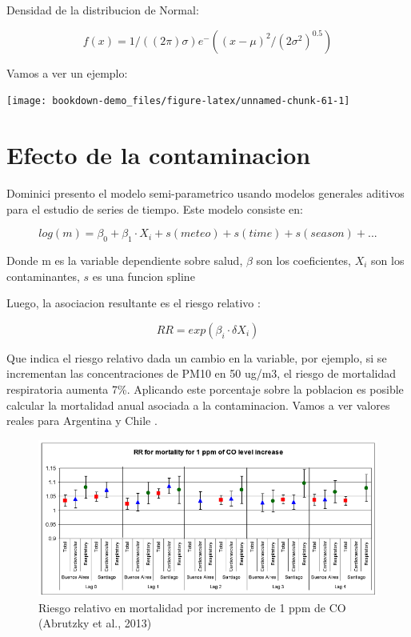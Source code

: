 \documentclass[]{book}
\begin{document}
Densidad de la distribucion de Normal:

\begin{equation}
f(x) = 1/( (2 \pi) \sigma) e^-((x - \mu)^2/(2 \sigma^2)^0.5 )
\label{eq:13}
\end{equation}

Vamos a ver un ejemplo:

\texttt{[image: bookdown-demo\_files/figure-latex/unnamed-chunk-61-1]}

\hypertarget{efecto-de-la-contaminacion}{%
\section{Efecto de la contaminacion}\label{efecto-de-la-contaminacion}}

Dominici presento el modelo semi-parametrico usando modelos generales aditivos \citep{gam} para el estudio de series de tiempo. Este modelo consiste en:

\begin{equation}
log(m) = \beta_0 + \beta_1 \cdot X_i + s(meteo) + s(time) + s(season) + ...
\label{eq:13}
\end{equation}

Donde m es la variable dependiente sobre salud, \(\beta\) son los coeficientes, \(X_i\) son los contaminantes, \(s\) es una funcion spline

Luego, la asociacion resultante es el riesgo relativo \citep{rosana}:

\begin{equation}
RR = exp(\beta_i \cdot \delta X_i)
\label{eq:13}
\end{equation}

Que indica el riesgo relativo dada un cambio en la variable, por ejemplo, si se incrementan las concentraciones de PM10 en 50 ug/m3, el riesgo de mortalidad respiratoria aumenta 7\%. Aplicando este porcentaje sobre la poblacion es posible calcular la mortalidad anual asociada a la contaminacion. Vamos a ver valores reales para Argentina y Chile \citep{rosana}.

\begin{figure}
\includegraphics[width=11.44in,height=1.8\textheight]{figs/rosana1} \caption{Riesgo relativo en mortalidad por incremento de 1 ppm de CO (Abrutzky et al., 2013)}\label{fig:unnamed-chunk-62}
\end{figure}
\end{document}
